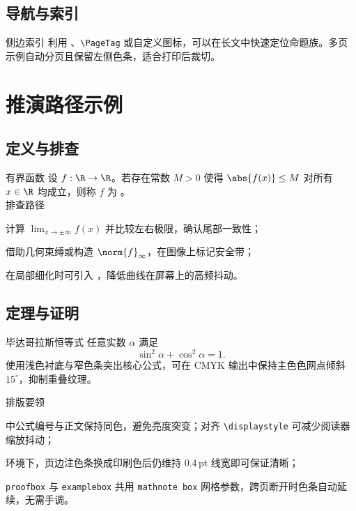 \documentclass[a4paper,11pt]{ctexart}
\begin{document}
\subsection{导航与索引}
\begin{lemmabox}{侧边索引}
利用 、\texttt{\textbackslash PageTag} 或自定义图标，可以在长文中快速定位命题族。多页示例自动分页且保留左侧色条，适合打印后裁切。
\end{lemmabox}

\clearpage
\section{推演路径示例}

\subsection{定义与排查}
\begin{definitionbox}{有界函数}
设 $f:\R\to\R$。若存在常数 $M>0$ 使得 $\abs{f(x)}\le M$ 对所有 $x\in\R$ 均成立，则称 $f$ 为 。
\\[0.4em]
\medskip\textcolor{inkgray}{\sffamily\small 排查路径}
\begin{focuspoints}
    \item 计算 $\displaystyle\lim_{x\to\pm\infty}f(x)$ 并比较左右极限，确认尾部一致性；
    \item 借助几何束缚或构造 $\norm{f}_{\infty}$，在图像上标记安全带；
    \item 在局部细化时可引入 ，降低曲线在屏幕上的高频抖动。
\end{focuspoints}
\end{definitionbox}

\subsection{定理与证明}
\begin{theorembox}{毕达哥拉斯恒等式}
任意实数 $\alpha$ 满足
\[
    \sin^2\alpha + \cos^2\alpha = 1.
\]
使用浅色衬底与窄色条突出核心公式，可在 CMYK 输出中保持主色色网点倾斜 $15^\circ$，抑制重叠纹理。
\end{theorembox}

\begin{proofbox}{排版要领}
\begin{focuspoints}
    \item {} 中公式编号与正文保持同色，避免亮度突变；对齐 \texttt{\textbackslash displaystyle} 可减少阅读器缩放抖动；
    \item {} 环境下，页边注色条换成印刷色后仍维持 0.4\,pt 线宽即可保证清晰；
    \item \texttt{proofbox} 与 \texttt{examplebox} 共用 \texttt{mathnote box} 网格参数，跨页断开时色条自动延续，无需手调。
\end{focuspoints}
\end{proofbox}
\end{document}
